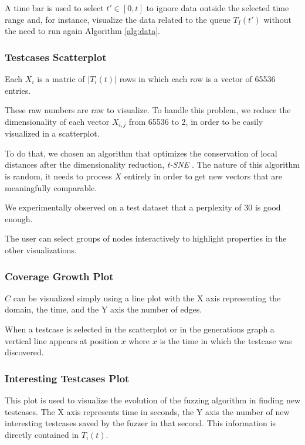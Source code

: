 \documentclass[conference,compsoc]{IEEEtran}
\begin{document}
A time bar is used to select $t' \in [0, t]$ to ignore data outside the selected time range and, for instance, visualize the data related to the queue $T_I(t')$ without the need to run again Algorithm \ref{alg:data}.

\subsubsection{Testcases Scatterplot}

Each $X_i$ is a matric of $|T_i(t)|$ rows in which each row is a vector of 65536 entries.

These raw numbers are raw to visualize. To handle this problem, we reduce the dimensionality of each vector $X_{i,j}$ from 65536 to 2, in order to be easily visualized in a scatterplot.

To do that, we chosen an algorithm that optimizes the conservation of local distances after the dimensionality reduction, {\em t-SNE} \cite{maaten2008visualizing}. The nature of this algorithm is random, it needs to process $X$ entirely in order to get new vectors that are meaningfully comparable.

We experimentally observed on a test dataset that a perplexity of 30 is good enough.

The user can select groups of nodes interactively to highlight properties in the other visualizations.

\subsubsection{Coverage Growth Plot}

$C$ can be visualized simply using a line plot with the X axis representing the domain, the time, and the Y axis the number of edges.

When a testcase is selected in the scatterplot or in the generations graph a vertical line appears at position $x$ where $x$ is the time in which the testcase was discovered.

\subsubsection{Interesting Testcases Plot}

This plot is used to visualize the evolution of the fuzzing algorithm in finding new testcases. The X axis represents time in seconds, the Y axis the number of new interesting testcases saved by the fuzzer in that second.
This information is directly contained in $T_i(t)$.
\end{document}
